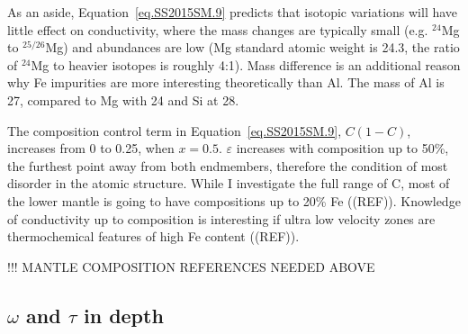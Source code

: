 As an aside, Equation~\ref{eq.SS2015SM.9} predicts that isotopic variations will have little effect on conductivity, where the mass changes are typically small (e.g. $^{24}$Mg to $^{25/26}$Mg) and abundances are low (Mg standard atomic weight is 24.3, the ratio of $^{24}$Mg to heavier isotopes is roughly 4:1). Mass difference is an additional reason why Fe impurities are more interesting theoretically than Al. The mass of Al is 27, compared to Mg with 24 and Si at 28.

The composition control term in Equation~\ref{eq.SS2015SM.9}, $C(1-C)$, increases from 0 to 0.25, when $x = 0.5$. $\varepsilon$ increases with composition up to 50\%, the furthest point away from both endmembers, therefore the condition of most disorder in the atomic structure. While I investigate the full range of C, most of the lower mantle \mgfesios is going to have compositions up to 20\% Fe ((REF)). Knowledge of conductivity up to \fesios composition is interesting if ultra low velocity zones are thermochemical features of high Fe content ((REF)). 

!!! MANTLE COMPOSITION REFERENCES NEEDED ABOVE

\subsection{$\omega$ and $\tau$ in depth} 

